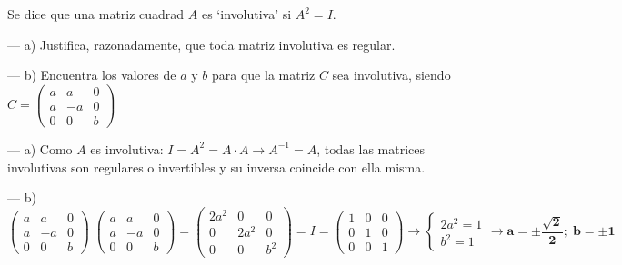 \begin{ejre}
Se dice que una matriz cuadrad $A$ es `involutiva' si $A^2=I$.

\noindent--- a) Justifica, razonadamente, que toda matriz involutiva es regular.

\noindent--- b) Encuentra los valores de $a$ y $b$ para que la matriz $C$ sea involutiva, siendo $C=\left( \begin{array}{ccc}  a&a&0\\a&-a&0\\0&0&b  \end{array} \right)$
\end{ejre}

\begin{proofw}\renewcommand{\qedsymbol}{$\diamond$}
\noindent	--- a) Como $A$ es involutiva: $ I=A^2=A\cdot A \to A^{-1}=A$, todas las matrices involutivas son regulares o invertibles y su inversa coincide con ella misma.
	
\noindent	--- b) $\left( \begin{array}{ccc}  a&a&0\\a&-a&0\\0&0&b  \end{array} \right) \; 
\left( \begin{array}{ccc}  a&a&0\\a&-a&0\\0&0&b  \end{array} \right) =
\left( \begin{array}{ccc}  2a^2&0&0\\0&2a^2&0\\0&0&b^2  \end{array} \right)
=I=\left( \begin{array}{ccc}  1&0&0\\0&1&0\\0&0&1  \end{array} \right) \to \begin{cases} 2a^2=1 \\b^2=1 \end{cases} \to \boldsymbol{a=\pm \dfrac {\sqrt{2}}{2} ; \; b=\pm 1}$
\end{proofw}

